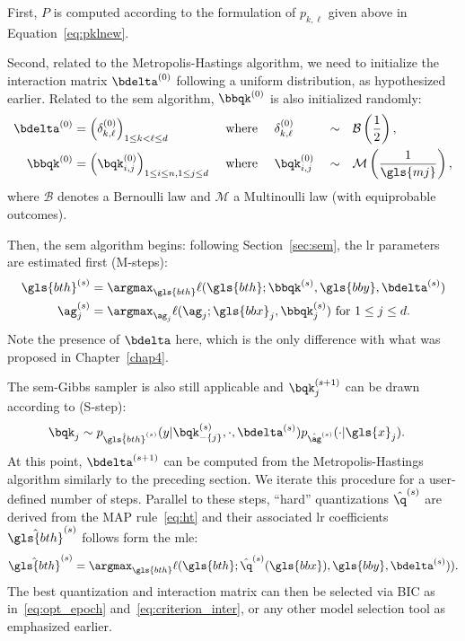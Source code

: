 First, $P$ is computed according to the formulation of $p_{k,\ell}$ given above in Equation~\eqref{eq:pklnew}.

Second, related to the Metropolis-Hastings algorithm, we need to initialize the interaction matrix $\bdelta^{(0)}$ following a uniform distribution, as hypothesized earlier. Related to the \gls{sem} algorithm, $\bbqk^{(0)}$ is also initialized randomly:
\begin{alignat*}{5}
\bdelta^{(0)} & = \left( \delta^{(0)}_{k,\ell} \right)_{1 \leq k < \ell \leq d} && \text{ where } && \delta^{(0)}_{k,\ell} && \sim && \mathcal{B} \left( \frac{1}{2} \right), \\
\bbqk^{(0)} & = \left( \bqk^{(0)}_{i,j} \right)_{1 \leq i \leq n, 1 \leq j \leq d} && \text{ where } && \bqk^{(0)}_{i,j} && \sim && \mathcal{M} \left( \frac{1}{\gls{mj}} \right),
\end{alignat*}
where $\mathcal{B}$ denotes a Bernoulli law and $\mathcal{M}$ a Multinoulli law (with equiprobable outcomes).

Then, the \gls{sem} algorithm begins: following Section~\ref{sec:sem}, the \gls{lr} parameters are estimated first (M-steps):
\begin{align*}
{\gls{bth}}^{(s)} & = \argmax_{\gls{bth}} \ell(\gls{bth} ; \bbqk^{(s)}, \gls{bby}, \bdelta^{(s)}) \\
{\ag}_j^{(s)} & = \argmax_{\ag_j} \ell(\ag_j ; \gls{bbx}_j, \bbqk^{(s)}_j) \text{ for } 1 \leq j \leq d.
\end{align*}
Note the presence of $\bdelta$ here, which is the only difference with what was proposed in Chapter~\ref{chap4}.

The \gls{sem}-Gibbs sampler is also still applicable and $\bqk_j^{(s+1)}$ can be drawn according to (S-step): 
\begin{align*}
\bqk_j & \sim p_{\hat{\gls{bth}}^{(s)}}(y | \bqk_{-\{j\}}^{(s)}, \cdot, \bdelta^{(s)}) p_{\hat{\ag}^{(s)}}(\cdot | \gls{x}_j).
\end{align*}
At this point, $\bdelta^{(s+1)}$ can be computed from the Metropolis-Hastings algorithm similarly to the preceding section. We iterate this procedure for a user-defined number of steps. Parallel to these steps, ``hard'' quantizations $\hat{\q}^{(s)}$ are derived from the MAP rule~\eqref{eq:ht} and their associated \gls{lr} coefficients $\hat{\gls{bth}}^{(s)}$ follows form the \gls{mle}:
\[\hat{\gls{bth}}^{(s)} = \argmax_{\gls{bth}} \ell(\gls{bth}; \hat{\q}^{(s)}(\gls{bbx}), \gls{bby}, \bdelta^{(s)})).\]
The best quantization and interaction matrix can then be selected via BIC as in~\eqref{eq:opt_epoch} and~\eqref{eq:criterion_inter}, or any other model selection tool as emphasized earlier.

